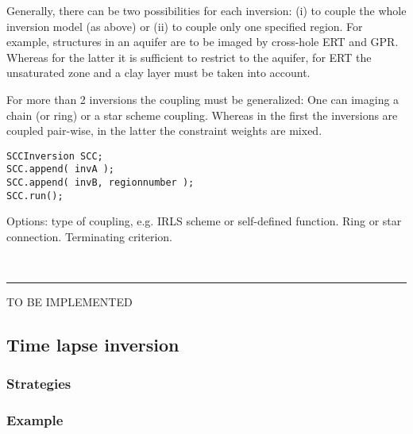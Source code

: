 \documentclass[a4paper,DIV12]{scrartcl}
\newcommand{\sperre}{\,\rule{1ex}{2ex}}
\begin{document}
Generally, there can be two possibilities for each inversion: (i) to couple the whole inversion model (as above) or (ii) to couple only one specified region.
For example, structures in an aquifer are to be imaged by cross-hole ERT and GPR. Whereas for the latter it is sufficient to restrict to the aquifer, for ERT the unsaturated zone and a clay layer must be taken into account.

For more than 2 inversions the coupling must be generalized: One can imaging a chain (or ring) or a star scheme coupling. 
Whereas in the first the inversions are coupled pair-wise, in the latter the  constraint weights are mixed. 

\begin{lstlisting}
SCCInversion SCC;
SCC.append( invA );
SCC.append( invB, regionnumber );
SCC.run(); 
\end{lstlisting}

Options: type of coupling, e.g. IRLS scheme or self-defined function. Ring or star connection. Terminating criterion.

\sperre{TO BE IMPLEMENTED}

\subsection{Time lapse inversion}\label{sec:timelapse}
\subsubsection*{Strategies}\label{sec:tlstrategies}
\subsubsection*{Example}

 

\begin{appendix}

\end{appendix}
\end{document}
